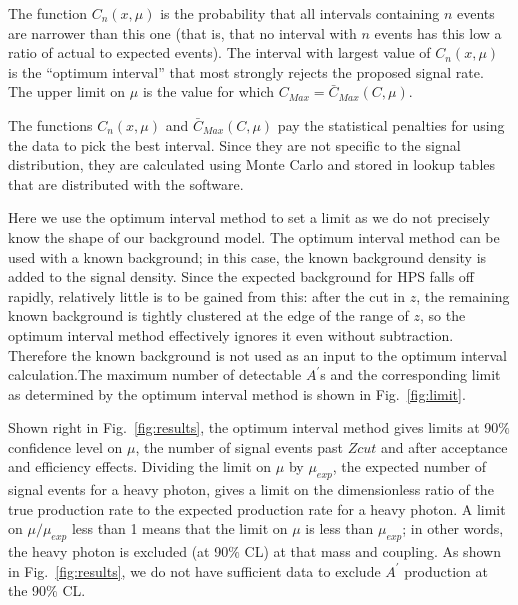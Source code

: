 \documentclass[twocolumn, showpacs, preprintnumbers,prd, superscriptaddress]{revtex4-1}
\begin{document}
The function $C_n(x,\mu)$ is the probability that all intervals containing $n$ events are narrower than this one (that is, that no interval with $n$ events has this low a ratio of actual to expected events).
The interval with largest value of $C_n(x,\mu)$ is the ``optimum interval'' that most strongly rejects the proposed signal rate.
The upper limit on $\mu$ is the value for which $C_{Max}=\bar{C}_{Max}(C,\mu)$.

The functions $C_n(x,\mu)$ and $\bar{C}_{Max}(C,\mu)$ pay the statistical penalties for using the data to pick the best interval.
Since they are not specific to the signal distribution, they are calculated using Monte Carlo and stored in lookup tables that are distributed with the software.

Here we use the optimum interval method to set a limit as we do not precisely know the shape of our background model. The optimum interval method can be used with a known background; in this case, the known background density is added to the signal density. Since the expected background for HPS falls off rapidly, relatively little is to be gained from this: after the cut in $z$, the remaining known background is tightly clustered at the edge of the range of $z$, so the optimum interval method effectively ignores it even without subtraction.
Therefore the known background is not used as an input to the optimum interval calculation.The maximum number of detectable $A^{\prime}$s and the corresponding limit as determined by the optimum interval method is shown in Fig.~\ref{fig:limit}.

Shown right in Fig.~\ref{fig:results}, the optimum interval method gives limits at 90$\%$ confidence level on $\mu$, the number of signal events past $Zcut$ and after acceptance and efficiency effects. Dividing the limit on $\mu$ by $\mu_{exp}$, the expected number of signal events for a heavy photon, gives a limit on the dimensionless ratio of the true production rate to the expected production rate for a heavy photon. A limit on $\mu / \mu_{exp}$ less than 1 means that the limit on $\mu$ is less than $\mu_{exp}$; in other words, the heavy photon is excluded (at 90$\%$ CL) at that mass and coupling. As shown in Fig.~\ref{fig:results}, we do not have sufficient data to exclude $A^{\prime}$ production at the 90$\%$ CL. 
\end{document}
